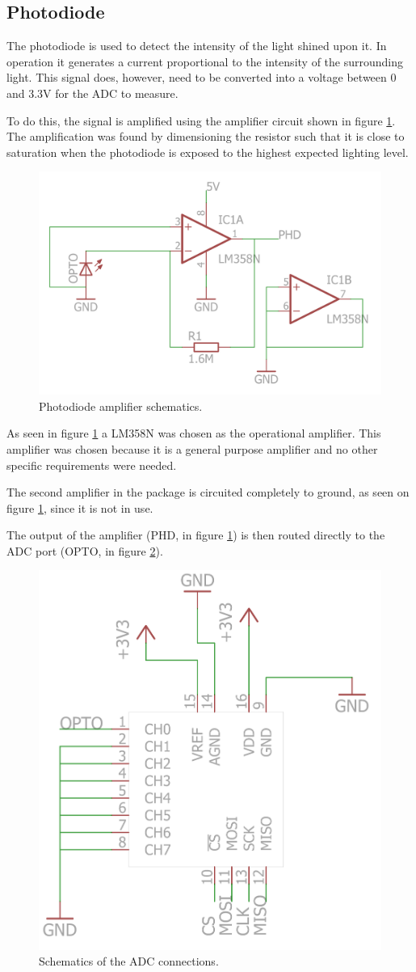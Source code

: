 

\subsection{Photodiode}
\label{sec:photodiode}
The photodiode is used to detect the intensity of the light shined upon it.
In operation it generates a current proportional to the intensity of the surrounding light.
This signal does, however, need to be converted into a voltage between 0 and 3.3V for the ADC to measure.

To do this, the signal is amplified using the amplifier circuit shown in figure \ref{fig:photodiodeschematics}.
The amplification was found by dimensioning the resistor such that it is close to saturation when the photodiode is exposed to the highest expected lighting level.


\begin{figure}[H]
\centering 
\includegraphics[width = 0.6 \textwidth]{images/optoamplifier_schematics}
\caption{Photodiode amplifier schematics.}
\label{fig:photodiodeschematics}
\end{figure}

As seen in figure \ref{fig:photodiodeschematics} a LM358N was chosen as the operational amplifier.
This amplifier was chosen because it is  a general purpose amplifier and no other specific requirements were needed.

The second amplifier in the package is circuited completely to ground, as seen on figure \ref{fig:photodiodeschematics}, since it is not in use.

The output of the amplifier (PHD, in figure \ref{fig:photodiodeschematics}) is then routed directly to the ADC port (OPTO, in figure \ref{fig:adc_schematics}).


\begin{figure}[H]
\centering 
\includegraphics[width = 0.4 \textwidth]{images/ADC_schematics}
\caption{Schematics of the ADC connections.}
\label{fig:adc_schematics}
\end{figure}


